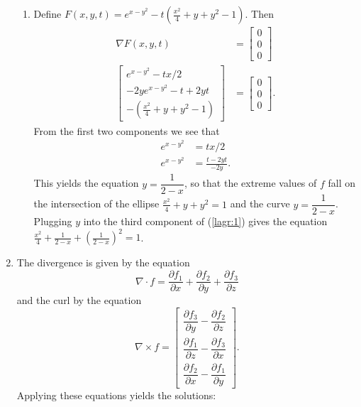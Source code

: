 \documentclass{article}
\begin{document}
\begin{enumerate}
\begin{enumerate}
 \item
  Define $F(x,y,t) = e^{x-y^2} - t(\frac{x^2}{4}+y+y^2 - 1)$.  Then
  \begin{align}
   \nabla F(x,y,t) &= \begin{bmatrix} 0 \\ 0 \\ 0 \end{bmatrix} \nonumber \\
   \begin{bmatrix}
    e^{x-y^2} - tx/2 \\
    -2ye^{x-y^2} - t + 2yt \\
    -(\frac{x^2}{4}+y+y^2 - 1)
   \end{bmatrix} &= \begin{bmatrix} 0 \\ 0 \\ 0 \end{bmatrix}. \label{lagr:1}
  \end{align}
  From the first two components we see that
  \begin{align*}
   e^{x-y^2} &= tx/2 \\
   e^{x - y^2} &= \frac{t-2yt}{-2y}.
  \end{align*}
  This yields the equation $y = \dfrac{1}{2-x}$, so that the extreme values
  of $f$ fall on the intersection of the ellipse $\frac{x^2}{4}+y+y^2 = 1$
  and the curve $y = \dfrac{1}{2-x}$.
  Plugging $y$ into the third component of (\ref{lagr:1}) gives the equation
  $\frac{x^2}{4} + \frac{1}{2-x} + (\frac{1}{2-x})^2 = 1$.

\end{enumerate}

\item

The divergence is given by the equation \[
 \nabla \cdot f = \frac{\partial f_1}{\partial x} + \frac{\partial f_2}{\partial y} + \frac{\partial f_3}{\partial z}
\] and the curl by the equation \[
 \nabla \times f = \begin{bmatrix}
  \dfrac{\partial f_3}{\partial y} - \dfrac{\partial f_2}{\partial z} \\
  \dfrac{\partial f_1}{\partial z} - \dfrac{\partial f_3}{\partial x} \\
  \dfrac{\partial f_2}{\partial x} - \dfrac{\partial f_1}{\partial y}
 \end{bmatrix}.
\]  Applying these equations yields the solutions:


\end{enumerate}
\end{document}
